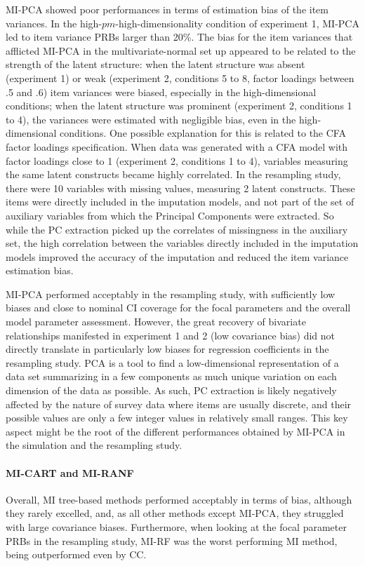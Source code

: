 	MI-PCA showed poor performances in terms of estimation bias of the item variances.
	In the high-$pm$-high-dimensionality condition of experiment 1, MI-PCA led to item variance PRBs larger 
	than 20\%.
	The bias for the item variances that afflicted MI-PCA in the multivariate-normal set up appeared to be related to 
	the strength of the latent structure: when the latent structure was absent (experiment 1) or weak (experiment 2, 
	conditions 5 to 8, factor loadings between .5 and .6) item variances were biased, especially in the high-dimensional
	conditions; 
	when the latent structure was prominent (experiment 2, conditions 1 to 4), the variances were estimated with 
	negligible bias, even in the high-dimensional conditions.
	One possible explanation for this is related to the CFA factor loadings specification. 
	When data was generated with a CFA model with factor loadings close to 1 (experiment 2, conditions 1 to 4), variables 
	measuring the same latent constructs became highly correlated.
	In the resampling study, there were 10 variables with missing values, measuring 2 latent constructs.
	These items were directly included in the imputation models, and not part of the set of auxiliary variables from which
	the Principal Components were extracted.
	So while the PC extraction picked up the correlates of missingness in the auxiliary set, the high correlation
	between the variables directly included in the imputation models improved the accuracy of the imputation and
	reduced the item variance estimation bias.

	MI-PCA performed acceptably in the resampling study, with sufficiently low biases and close to nominal 
	CI coverage for the focal parameters and the overall model parameter assessment.
	However, the great recovery of bivariate relationships manifested in experiment 1 and 2 (low covariance bias) 
	did not directly translate in particularly low biases for regression coefficients in the resampling study.
	PCA is a tool to find a low-dimensional representation of a data set summarizing in a few components as much 
	unique variation on each dimension of the data as possible.
	As such, PC extraction is likely negatively affected by the nature of survey data where items are 
	usually discrete, and their possible values are only a few integer values in relatively small ranges.
	This key aspect might be the root of the different performances obtained by MI-PCA in the simulation and the 
	resampling study.

\paragraph{MI-CART and MI-RANF}
	Overall, MI tree-based methods performed acceptably in terms of bias, although they rarely excelled,
	and, as all other methods except MI-PCA, they struggled with large covariance biases.
	Furthermore, when looking at the focal parameter PRBs in the resampling study, MI-RF was the worst 
	performing MI method, being outperformed even by CC.

